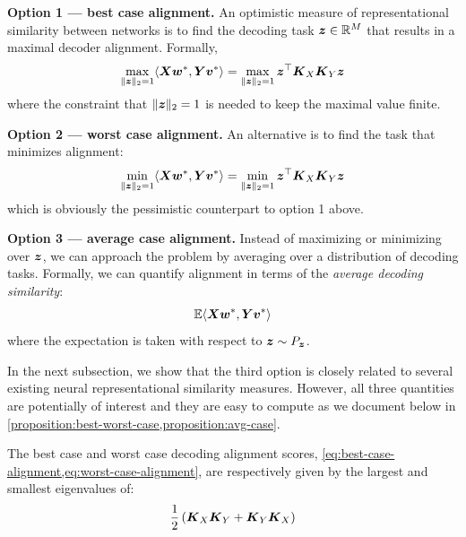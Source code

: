 \textbf{Option 1 --- best case alignment.}
An optimistic measure of representational similarity between networks is to find the decoding task $\boldsymbol{z} \in \mathbb{R}^M$ that results in a maximal decoder alignment.
Formally,
\begin{equation}
\label{eq:best-case-alignment}
\max_{\Vert \boldsymbol{z} \Vert_2 = 1} \langle \boldsymbol{X} \boldsymbol{w}^*, \boldsymbol{Y} \boldsymbol{v}^* \rangle = \max_{\Vert \boldsymbol{z} \Vert_2 = 1} \boldsymbol{z}^\top \boldsymbol{K}_X \boldsymbol{K}_Y \boldsymbol{z}
\end{equation}
where the constraint that $\Vert \boldsymbol{z} \Vert_2 = 1$ is needed to keep the maximal value finite.

\textbf{Option 2 --- worst case alignment.}
An alternative is to find the  task that minimizes alignment:
\begin{equation}
\label{eq:worst-case-alignment}
\min_{\Vert \boldsymbol{z} \Vert_2 = 1} \langle \boldsymbol{X} \boldsymbol{w}^*, \boldsymbol{Y} \boldsymbol{v}^* \rangle = \min_{\Vert \boldsymbol{z} \Vert_2 = 1} \boldsymbol{z}^\top \boldsymbol{K}_X \boldsymbol{K}_Y \boldsymbol{z}
\end{equation}
which is obviously the pessimistic counterpart to option 1 above.

\textbf{Option 3 --- average case alignment.}
Instead of maximizing or minimizing over $\boldsymbol{z}$, we can approach the problem by averaging over a distribution of decoding tasks.
Formally, we can quantify alignment in terms of the \textit{average decoding similarity}:
\begin{equation}
\label{eq:average-case-alignment}
\mathbb{E} \langle \boldsymbol{X} \boldsymbol{w}^*, \boldsymbol{Y} \boldsymbol{v}^* \rangle
\end{equation}
where the expectation is taken with respect to $\boldsymbol{z} \sim P_{\boldsymbol{z}}$.

In the next subsection, we show that the third option is closely related to several existing neural representational similarity measures.
However, all three quantities are potentially of interest and they are easy to compute as we document below in \cref{proposition:best-worst-case,proposition:avg-case}.

\begin{proposition}
\label{proposition:best-worst-case}
The best case and worst case decoding alignment scores, \cref{eq:best-case-alignment,eq:worst-case-alignment}, are respectively given by the largest and smallest eigenvalues of:
\begin{equation}
\frac{1}{2} \left ( \boldsymbol{K}_X \boldsymbol{K}_Y + \boldsymbol{K}_Y \boldsymbol{K}_X \right )
\end{equation}
\end{proposition}

